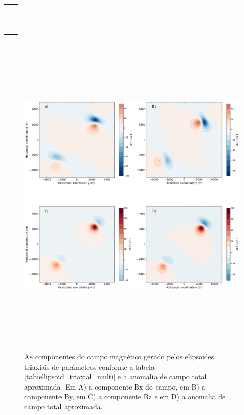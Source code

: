 \begin{table}[h!]
	\begin{center}
		\begin{tabular}{lc}
			
			&  \\
			& \\
			& \\
			& \\
			& \\
			& \\ 
			& \\
			& \\
				& \\
				& \\ 
				& \\
		\end{tabular}
	\end{center}
\end{table}

\begin{figure}[hbt!]
	\centering \includegraphics[width=16cm,height=16cm]{figures/ellipsoid_triaxial_multi}
	\caption[As componentes do campo magnético gerado por dois corpos triaxiais e a anomalia de campo total aproximada.]{As componentes 
		do campo magnético gerado pelos elipsoides triaxiais de parâmetros conforme a tabela \ref{tab:ellipsoid_triaxial_multi} e a anomalia de campo total aproximada. Em A) a componente Bx do campo, em B) a componente By, em C) a componente Bz e em D) a anomalia de campo total aproximada.}
	\label{fig:ellipsoid_triaxial_multi}
\end{figure}

